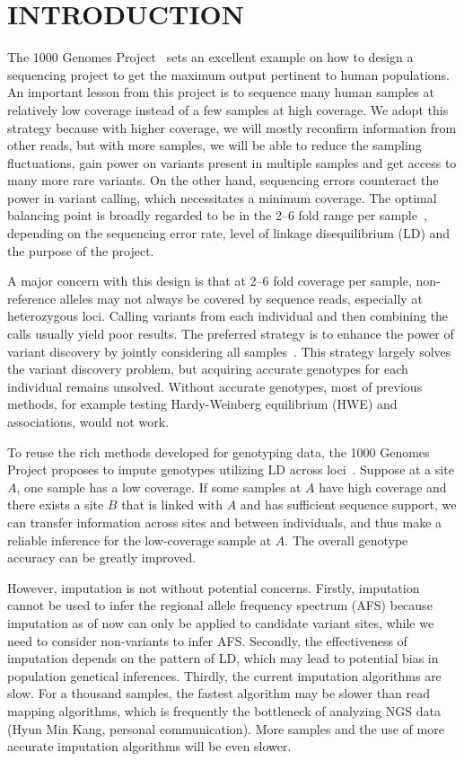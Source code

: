 \documentclass{bioinfo}
\begin{document}
\section{INTRODUCTION}

The 1000 Genomes Project~\citep{1000-Genomes-Project-Consortium:2010qc} sets an
excellent example on how to design a sequencing project to get the maximum
output pertinent to human populations. An important lesson from this project is to
sequence many human samples at relatively low coverage instead of a few samples
at high coverage. We adopt this strategy because with higher coverage, we will mostly
reconfirm information from other reads, but with more samples, we will be able to
reduce the sampling fluctuations, gain power on variants present in multiple
samples and get access to many more rare variants. On the other hand,
sequencing errors counteract the power in variant calling, which necessitates a
minimum coverage.  The optimal balancing point is broadly regarded to be in the
2--6 fold range per sample~\citep{Le:2010uq,Li:2011fk}, depending on the
sequencing error rate, level of linkage disequilibrium (LD) and the purpose of the
project.

A major concern with this design is that at 2--6 fold coverage per sample,
non-reference alleles may not always be covered by sequence reads, especially
at heterozygous loci. Calling variants from each individual and then combining
the calls usually yield poor results. The preferred strategy is to enhance the
power of variant discovery by jointly considering all
samples~\citep{Le:2010uq,Li:2011fk,Depristo:2011vn,Nielsen:2011fk}. This
strategy largely solves the variant discovery problem, but acquiring accurate
genotypes for each individual remains unsolved. Without accurate genotypes,
most of previous methods, for example testing Hardy-Weinberg equilibrium (HWE)
and associations, would not work.

To reuse the rich methods developed for genotyping data, the 1000 Genomes
Project proposes to impute genotypes utilizing LD across
loci~\citep{Li:2009gb,Browning:2009jl,Howie:2009mb,Li:2010ky}.  Suppose at a
site $A$, one sample has a low coverage. If some samples at $A$ have high
coverage and there exists a site $B$ that is linked with $A$ and has sufficient
sequence support, we can transfer information across sites and between
individuals, and thus make a reliable inference for the low-coverage sample at
$A$. The overall genotype accuracy can be greatly improved.

However, imputation is not without potential concerns. Firstly, imputation
cannot be used to infer the regional allele frequency spectrum (AFS) because
imputation as of now can only be applied to candidate variant sites, while we
need to consider non-variants to infer AFS.  Secondly, the effectiveness of
imputation depends on the pattern of LD, which may lead to potential bias in
population genetical inferences. Thirdly, the current imputation algorithms are
slow. For a thousand samples, the fastest algorithm may be slower than read
mapping algorithms, which is frequently the bottleneck of analyzing NGS data
(Hyun Min Kang, personal communication). More samples and the use of more
accurate imputation algorithms will be even slower.
\end{document}
